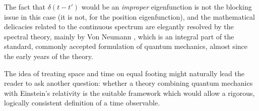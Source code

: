 The fact that $\delta(t-t')$ would be an \emph{improper} eigenfunction
is not the blocking issue in this case (it is not, for the position eigenfunction),
and the mathematical delicacies related to the continuous spectrum are
elegantly resolved by the spectral theory, mainly by Von Neumann
\parencite{VonNeumann}, which is an integral part of the standard, commonly accepted
formulation of quantum mechanics, almost since the early years of the theory.

The idea of treating space and time on equal footing might naturally lead the reader to
ask another question: whether a theory combining quantum mechanics with Einstein's
relativity is the suitable framework which would allow a rigorous, logically consistent
definition of a time observable.
